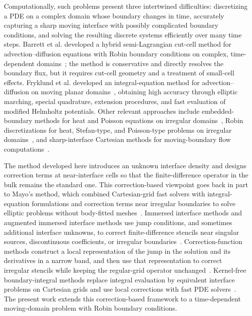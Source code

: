 \documentclass[11pt,reqno]{amsart}
\theoremstyle{plain}
\theoremstyle{definition}
\numberwithin{equation}{section}
\begin{document}
Computationally, such problems present three intertwined difficulties: discretizing a PDE on a complex domain whose boundary changes in time, accurately capturing a sharp moving interface with possibly complicated boundary conditions, and solving the resulting discrete systems efficiently over many time steps. Barrett et al. developed a hybrid semi-Lagrangian cut-cell method for advection--diffusion equations with Robin boundary conditions on complex, time-dependent domains~\cite{Barrett2022}; the method is conservative and directly resolves the boundary flux, but it requires cut-cell geometry and a treatment of small-cell effects. Fryklund et al. developed an integral-equation method for advection--diffusion on moving planar domains~\cite{Fryklund2023}, obtaining high accuracy through elliptic marching, special quadrature, extension procedures, and fast evaluation of modified Helmholtz potentials. Other relevant approaches include embedded-boundary methods for heat and Poisson equations on irregular domains~\cite{McCorquodaleColellaJohansen2001,SchwartzBaradColellaLigocki2006}, Robin discretizations for heat, Stefan-type, and Poisson-type problems on irregular domains~\cite{PapacGibouRatsch2010,AriasBochkovGibou2018,BochkovGibou2019,ChaiEtAl2020,ChaiEtAl2021}, and sharp-interface Cartesian methods for moving-boundary flow computations~\cite{Udaykumar2001,MarellaKrishnanLiuUdaykumar2005}.

The method developed here introduces an unknown interface density and designs correction terms at near-interface cells so that the finite-difference operator in the bulk remains the standard one. This correction-based viewpoint goes back in part to Mayo's method, which combined Cartesian-grid fast solvers with integral-equation formulations and correction terms near irregular boundaries to solve elliptic problems without body-fitted meshes~\cite{Mayo1984,Mayo1985}. Immersed interface methods and augmented immersed interface methods use jump conditions, and sometimes additional interface unknowns, to correct finite-difference stencils near singular sources, discontinuous coefficients, or irregular boundaries~\cite{LeVequeLi1994,Li2003,LiIto2006,LiItoLai2007}. Correction-function methods construct a local representation of the jump in the solution and its derivatives in a narrow band, and then use that representation to correct irregular stencils while keeping the regular-grid operator unchanged~\cite{MarquesNaveRosalesSeibold2011,WiegmannBube2000}. Kernel-free boundary-integral methods replace integral evaluation by equivalent interface problems on Cartesian grids and use local corrections with fast PDE solvers~\cite{YingHenriquez2007,zhou2024correction}. The present work extends this correction-based framework to a time-dependent moving-domain problem with Robin boundary conditions.
\end{document}
